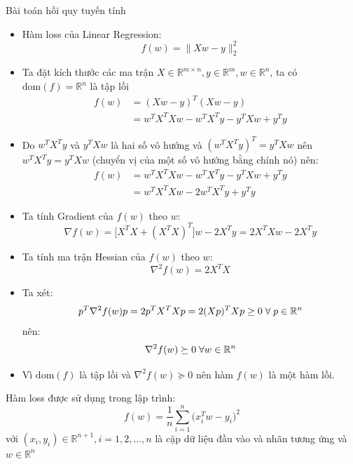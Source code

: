 \documentclass[10pt]{beamer}
\theoremstyle{remark}
\theoremstyle{definition}
\begin{document}
\begin{frame}[allowframebreaks]{Bài toán hồi quy tuyến tính}
	\begin{itemize}
		\item Hàm loss của Linear Regression:
		\begin{equation*}
			f(w) = \lVert X w - y \rVert_2^2
		\end{equation*}
		\item Ta đặt kích thước các ma trận $X \in \mathbb{R}^{m \times n}, y \in \mathbb{R}^m, w \in \mathbb{R}^n$, ta có $\mathrm{dom}(f)=\mathbb{R}^{n}$ là tập lồi
		\begin{equation*}
			\begin{aligned}
				f(w) &= (Xw - y)^T (Xw - y) \\
				&=w^T X^T X w - w^TX^Ty - y^T Xw + y^T y
			\end{aligned}
		\end{equation*}
		\item Do $w^TX^Ty$ và $y^TXw$ là hai số vô hướng và $(w^TX^Ty)^T=y^TXw$ nên $w^TX^Ty=y^TXw$ (chuyển vị của một số vô hướng bằng chính nó) nên:
		\begin{equation*}
			\begin{aligned}
				f(w) &= w^T X^T X w - w^TX^Ty - y^T Xw + y^T y\\
				&=w^T X^T X w-2w^TX^Ty+y^Ty
			\end{aligned}
		\end{equation*}
		\item Ta tính Gradient của $f(w)$ theo $w$:
		\begin{equation*}
			\nabla f(w) =\Big\lbrack X^TX + (X^TX)^T \Big\rbrack w - 2X^Ty = 2X^T X w - 2 X^T y
		\end{equation*}
		\item Ta tính ma trận Hessian của $f(w)$ theo $w$:
		\begin{equation*}
			\nabla^2 f(w) = 2X^T X
		\end{equation*}
		\item Ta xét:
		\begin{equation*}
			p^T \nabla^2 f(w) p = 2 p^T X^T X p = 2 (Xp)^TXp \geq 0 \thickspace\forall \thickspace p \in \mathbb{R}^{n}
		\end{equation*}
		nên:
		\begin{equation*}
			\nabla^2 f(w) \succeq 0 \thickspace \forall w \in \mathbb{R}^{n}
		\end{equation*}
		\item Vì $\mathrm{dom}(f)$ là tập lồi và $\nabla^2 f(w) \succeq 0$ nên hàm $f(w)$ là một hàm lồi.
	\end{itemize}
	Hàm loss được sử dụng trong lập trình:
	\begin{equation*}
		f(w) = \dfrac{1}{n}\sum_{i=1}^{n}\Big( x_i^T w - y_i \Big)^2
	\end{equation*}
	với $(x_i, y_i) \in \mathbb{R}^{n+1}, i=1, 2, \dots, n$ là cặp dữ liệu đầu vào và nhãn tương ứng và $w \in \mathbb{R}^n$
	

\end{frame}
\end{document}
